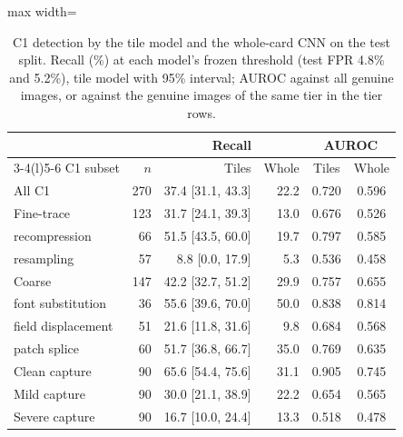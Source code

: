 \documentclass[12pt]{article}
\begin{document}
\begin{table}[H]
\caption{C1 detection by the tile model and the whole-card CNN on the test split. Recall (\%) at each model's frozen threshold (test FPR 4.8\% and 5.2\%), tile model with 95\% interval; AUROC against all genuine images, or against the genuine images of the same tier in the tier rows.}
\label{tab:rq1}
\centering
\scriptsize
\setlength{\tabcolsep}{2.6pt}
\renewcommand{\arraystretch}{1.06}
\begin{adjustbox}{max width=\linewidth}
\begin{tabular}{@{}l r r r c c@{}}
\toprule
 & & \multicolumn{2}{c}{Recall} & \multicolumn{2}{c}{AUROC} \\ \cmidrule(lr){3-4}\cmidrule(l){5-6}
C1 subset & $n$ & Tiles & Whole & Tiles & Whole \\
\midrule
All C1 & 270 & 37.4 {\tiny[31.1, 43.3]} & 22.2 & 0.720 & 0.596 \\
Fine-trace & 123 & 31.7 {\tiny[24.1, 39.3]} & 13.0 & 0.676 & 0.526 \\
\quad recompression & 66 & 51.5 {\tiny[43.5, 60.0]} & 19.7 & 0.797 & 0.585 \\
\quad resampling & 57 & 8.8 {\tiny[0.0, 17.9]} & 5.3 & 0.536 & 0.458 \\
Coarse & 147 & 42.2 {\tiny[32.7, 51.2]} & 29.9 & 0.757 & 0.655 \\
\quad font substitution & 36 & 55.6 {\tiny[39.6, 70.0]} & 50.0 & 0.838 & 0.814 \\
\quad field displacement & 51 & 21.6 {\tiny[11.8, 31.6]} & 9.8 & 0.684 & 0.568 \\
\quad patch splice & 60 & 51.7 {\tiny[36.8, 66.7]} & 35.0 & 0.769 & 0.635 \\
\addlinespace[4pt]
Clean capture & 90 & 65.6 {\tiny[54.4, 75.6]} & 31.1 & 0.905 & 0.745 \\
Mild capture & 90 & 30.0 {\tiny[21.1, 38.9]} & 22.2 & 0.654 & 0.565 \\
Severe capture & 90 & 16.7 {\tiny[10.0, 24.4]} & 13.3 & 0.518 & 0.478 \\
\bottomrule
\end{tabular}
\end{adjustbox}
\end{table}
\clearpage
\end{document}
